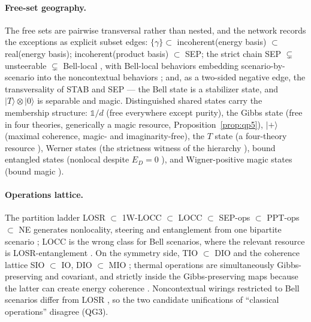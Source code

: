 \documentclass[11pt,a4paper]{article}
\theoremstyle{definition}
\newcommand{\ket}[1]{\lvert #1 \rangle}
\newcommand{\id}{\mathbb{1}}
\begin{document}
\paragraph{Free-set geography.} The free sets are pairwise transversal rather
than nested, and the network records the exceptions as explicit subset edges:
$\{\gamma\}\subset$ incoherent(energy basis) $\subset$ real(energy basis);
incoherent(product basis) $\subset$ SEP; the strict chain SEP $\subsetneq$
unsteerable $\subsetneq$ Bell-local
\cite{wjd2007,werner1989,barrett2002,quintino2015}, with Bell-local behaviors
embedding scenario-by-scenario into the noncontextual behaviors
\cite{amaral2018}; and, as a two-sided negative edge, the transversality of
STAB and SEP --- the Bell state is a stabilizer state, and
$\ket{T}\otimes\ket{0}$ is separable and magic. Distinguished shared states
carry the membership structure: $\id/d$ (free everywhere except purity),
the Gibbs state (free in four theories, generically a magic resource,
Proposition~\ref{prop:qp5}), $\ket{+}$ (maximal coherence, magic- and
imaginarity-free), the $T$ state (a four-theory resource
\cite{bravyikitaev2005}), Werner states (the strictness witness of the
hierarchy \cite{werner1989,barrett2002,wjd2007}), bound entangled states
(nonlocal despite $E_D=0$ \cite{vertesi2014}), and Wigner-positive magic
states (bound magic \cite{veitch2012}).

\paragraph{Operations lattice.} The partition ladder LOSR $\subset$ 1W-LOCC
$\subset$ LOCC $\subset$ SEP-ops $\subset$ PPT-ops $\subset$ NE generates
nonlocality, steering and entanglement from one bipartite scenario
\cite{gallegoaolita2015,wolfe2020}; LOCC is the wrong class for Bell
scenarios, where the relevant resource is LOSR-entanglement \cite{wolfe2020}.
On the symmetry side, TIO $\subset$ DIO and the coherence
lattice SIO $\subset$ IO, DIO $\subset$ MIO \cite{marvianspekkens2016};
thermal operations are simultaneously Gibbs-preserving and covariant, and
strictly inside the Gibbs-preserving maps because the latter can create
energy coherence \cite{faist2015}. Noncontextual wirings restricted to Bell
scenarios differ from LOSR \cite{santos2024}, so the two candidate
unifications of ``classical operations'' disagree (QG3).
\end{document}
